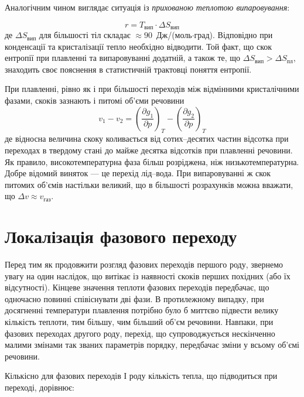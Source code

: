 Аналогічним чином виглядає ситуація із \emph{прихованою теплотою випаровування}:

\begin{equation}
r = T_{\text{вип}} \cdot \Delta S_{\text{вип}}
\end{equation}
%
де $\Delta S_{\text{вип}}$ для більшості тіл складає $\approx 90$~Дж/(моль$\cdot$град). Відповідно при
конденсації та кристалізації тепло необхідно відводити. Той факт, що скок ентропії при плавленні та
випаровуванні додатній, а також те, що $\Delta S_{\text{вип}} > \Delta S_{\text{пл}}$, знаходить своє
пояснення в статистичній трактовці поняття ентропії.

При плавленні, рівно як і при більшості переходів між відмінними кристалічними фазами, скоків зазнають
і питомі об'єми речовини
\begin{equation*}
v_1 - v_2 = \left(\frac{\partial g_1}{\partial p}\right)_T - \left(\frac{\partial g_2}{\partial
p}\right)_T
\end{equation*}
де відносна величина скоку коливається від сотих--десятих частин відсотка при переходах в твердому
стані до майже десятка відсотків при плавленні речовини. Як правило, високотемпературна фаза більш
розріджена, ніж низькотемпературна. Добре відомий виняток --- це перехід лід--вода. При випаровуванні
ж скок питомих об'ємів настільки великий, що в більшості розрахунків можна вважати, що $\Delta v
\approx v_{\text{газ}}$.


\section{Локалізація фазового переходу}


Перед тим як продовжити розгляд фазових переходів першого роду, звернемо увагу на один
наслідок, що витікає із наявності скоків перших похідних (або їх відсутності). Кінцеве значення
теплоти фазових переходів передбачає, що одночасно повинні співіснувати дві фази. В протилежному
випадку, при досягненні температури плавлення потрібно було б миттєво підвести велику кількість
теплоти, тим більшу, чим більший об'єм речовини. Навпаки, при фазових переходах другого роду, перехід,
що супроводжується нескінченно малими змінами так званих параметрів порядку, передбачає зміни у всьому
об'ємі речовини.

Кількісно для фазових переходів І роду кількість тепла, що підводиться при переході, дорівнює:

